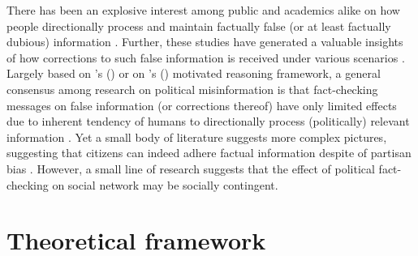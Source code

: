 \documentclass[man, 12pt, a4paper]{apa6}
\begin{document}
There has been an explosive interest among public and academics alike on how people directionally process and maintain factually false (or at least factually dubious) information \parencite{LEWANDOWSKY_JARMC2017, garrett2016driving}. Further, these studies have generated a valuable insights of how corrections to such false information is received under various scenarios \parencite{LEWANDOWSKY_JARMC2017, thorson_2016}. Largely based on \citeauthor{kunda1990}'s (\citeyear{kunda1990}) or on \citeauthor{taber2006}'s (\citeyear{taber2006}) motivated reasoning framework, a general consensus among research on political misinformation is that fact-checking messages on false information (or corrections thereof) have only limited effects due to inherent tendency of humans to directionally process (politically) relevant information \parencite{thorson_2016}. Yet a small body of literature suggests more complex pictures, suggesting that citizens can indeed adhere factual information despite of partisan bias \parencite[e.g.,][]{Wood2018, Garrett_Weeks_2013}. However, a small line of research suggests that the effect of political fact-checking on social network may be socially contingent. 

\section{Theoretical framework}

\printbibliography
\end{document}
